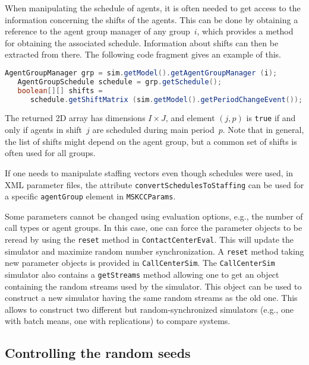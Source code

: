 When manipulating the schedule of agents, it is often needed to get
access to the information concerning the shifts of the agents.
This can be done by obtaining a reference to the agent group manager
of any group~$i$, which provides a method for obtaining the associated
schedule.
Information about shifts can then be extracted from there.
The following code fragment gives an example of this.
\begin{lstlisting}[language=Java,frame={}]
   AgentGroupManager grp = sim.getModel().getAgentGroupManager (i);
   AgentGroupSchedule schedule = grp.getSchedule();
   boolean[][] shifts =
      schedule.getShiftMatrix (sim.getModel().getPeriodChangeEvent());
\end{lstlisting}
The returned 2D array has dimensions $I\times J$, and element
$(j,p)$ is \texttt{true} if and only if agents in shift~$j$ are
scheduled
during main period~$p$.
Note that in general, the list of shifts might depend on the agent
group, but a common set of shifts is often used for all groups.

If one needs to manipulate staffing vectors even though schedules were
used, in XML parameter files,
the attribute
\texttt{convert\-Schedules\-To\-Staffing} can be used for a specific
\texttt{agent\-Group} element in
\texttt{MSKCCParams}.

Some
parameters cannot be changed using evaluation options, e.g., the
number of call types or agent groups.  In this case, one can force the
parameter objects to be reread by using the \texttt{reset} method in
\texttt{Contact\-Center\-Eval}.  This will update the simulator and
maximize random number synchronization.
A \texttt{reset} method taking new parameter objects is provided
in \texttt{Call\-Center\-Sim}.
The \texttt{Call\-Center\-Sim} simulator also contains a
\texttt{get\-Streams}
method allowing one to get an object containing the random streams
used by the simulator.
This object can be used to construct a new simulator having the same
random streams as the old one.
This allows to construct two different but random-synchronized
simulators (e.g., one with batch means, one with replications) to
compare systems.


\subsection{Controlling the random seeds}
\label{sec:randomstreams}


